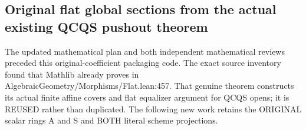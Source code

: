 \subsection{Original flat global sections from the actual existing QCQS pushout theorem}

The updated mathematical plan and both independent mathematical reviews
preceded this original-coefficient packaging code. The exact source inventory found that Mathlib already proves
\texttt{} in
AlgebraicGeometry/Morphisms/Flat.lean:457. That genuine theorem constructs
its actual finite affine covers and flat equalizer argument for QCQS opens;
it is REUSED rather than duplicated. The following new work retains the
ORIGINAL scalar rings A and S and BOTH literal scheme projections.

